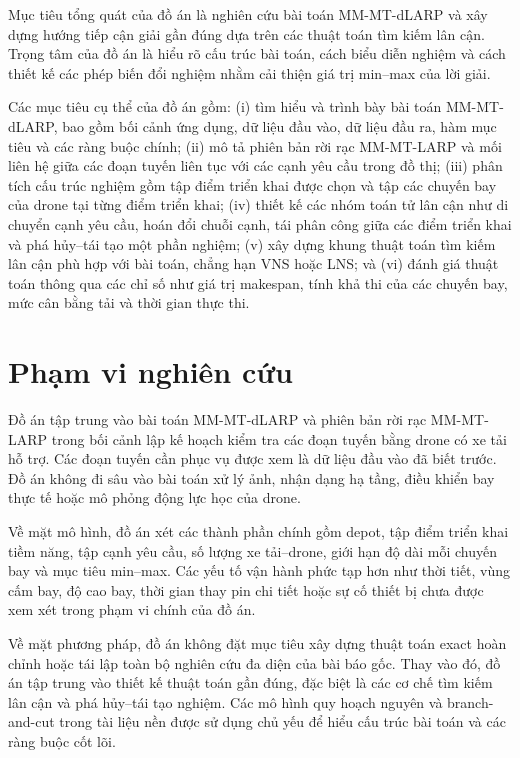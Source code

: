 Mục tiêu tổng quát của đồ án là nghiên cứu bài toán MM-MT-dLARP và xây dựng hướng tiếp cận giải gần đúng dựa trên các thuật toán tìm kiếm lân cận. Trọng tâm của đồ án là hiểu rõ cấu trúc bài toán, cách biểu diễn nghiệm và cách thiết kế các phép biến đổi nghiệm nhằm cải thiện giá trị min--max của lời giải.

Các mục tiêu cụ thể của đồ án gồm: (i) tìm hiểu và trình bày bài toán MM-MT-dLARP, bao gồm bối cảnh ứng dụng, dữ liệu đầu vào, dữ liệu đầu ra, hàm mục tiêu và các ràng buộc chính; (ii) mô tả phiên bản rời rạc MM-MT-LARP và mối liên hệ giữa các đoạn tuyến liên tục với các cạnh yêu cầu trong đồ thị; (iii) phân tích cấu trúc nghiệm gồm tập điểm triển khai được chọn và tập các chuyến bay của drone tại từng điểm triển khai; (iv) thiết kế các nhóm toán tử lân cận như di chuyển cạnh yêu cầu, hoán đổi chuỗi cạnh, tái phân công giữa các điểm triển khai và phá hủy--tái tạo một phần nghiệm; (v) xây dựng khung thuật toán tìm kiếm lân cận phù hợp với bài toán, chẳng hạn VNS hoặc LNS; và (vi) đánh giá thuật toán thông qua các chỉ số như giá trị makespan, tính khả thi của các chuyến bay, mức cân bằng tải và thời gian thực thi.

\section{Phạm vi nghiên cứu}

Đồ án tập trung vào bài toán MM-MT-dLARP và phiên bản rời rạc MM-MT-LARP trong bối cảnh lập kế hoạch kiểm tra các đoạn tuyến bằng drone có xe tải hỗ trợ. Các đoạn tuyến cần phục vụ được xem là dữ liệu đầu vào đã biết trước. Đồ án không đi sâu vào bài toán xử lý ảnh, nhận dạng hạ tầng, điều khiển bay thực tế hoặc mô phỏng động lực học của drone.

Về mặt mô hình, đồ án xét các thành phần chính gồm depot, tập điểm triển khai tiềm năng, tập cạnh yêu cầu, số lượng xe tải--drone, giới hạn độ dài mỗi chuyến bay và mục tiêu min--max. Các yếu tố vận hành phức tạp hơn như thời tiết, vùng cấm bay, độ cao bay, thời gian thay pin chi tiết hoặc sự cố thiết bị chưa được xem xét trong phạm vi chính của đồ án.

Về mặt phương pháp, đồ án không đặt mục tiêu xây dựng thuật toán exact hoàn chỉnh hoặc tái lập toàn bộ nghiên cứu đa diện của bài báo gốc. Thay vào đó, đồ án tập trung vào thiết kế thuật toán gần đúng, đặc biệt là các cơ chế tìm kiếm lân cận và phá hủy--tái tạo nghiệm. Các mô hình quy hoạch nguyên và branch-and-cut trong tài liệu nền được sử dụng chủ yếu để hiểu cấu trúc bài toán và các ràng buộc cốt lõi.

